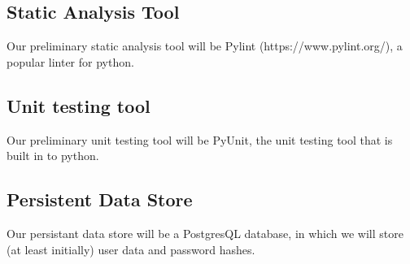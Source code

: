 \documentclass{article}
\begin{document}
\subsection{Static Analysis Tool}
Our preliminary static analysis tool will be Pylint (https://www.pylint.org/), a popular linter for python.
\subsection{Unit testing tool}
Our preliminary unit testing tool will be PyUnit, the unit testing tool that is built in to python.
\subsection{Persistent Data Store} 
Our persistant data store will be a PostgresQL database, in which we will store (at least initially) user data and password hashes.
\end{document}
